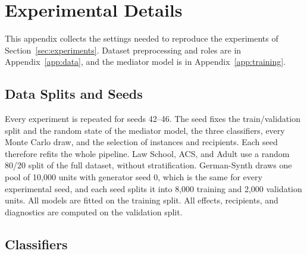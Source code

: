 \section{Experimental Details}
\label{app:experimental-settings}

This appendix collects the settings needed to reproduce the experiments of
Section~\ref{sec:experiments}. Dataset preprocessing and roles are in
Appendix~\ref{app:data}, and the mediator model is in
Appendix~\ref{app:training}.

\subsection{Data Splits and Seeds}
\label{app:exp_splits}

Every experiment is repeated for seeds 42--46. The seed fixes the
train/validation split and the random state of the mediator model, the three
classifiers, every Monte Carlo draw, and the selection of instances and
recipients. Each seed therefore refits the whole pipeline. Law School, ACS,
and Adult use a random 80/20 split of the full dataset, without
stratification. German-Synth draws one pool of 10{,}000 units with generator
seed 0, which is the same for every experimental seed, and each seed splits it
into 8{,}000 training and 2{,}000 validation units. All models are fitted on
the training split. All effects, recipients, and diagnostics are computed on
the validation split.

\subsection{Classifiers}
\label{app:exp_classifiers}

